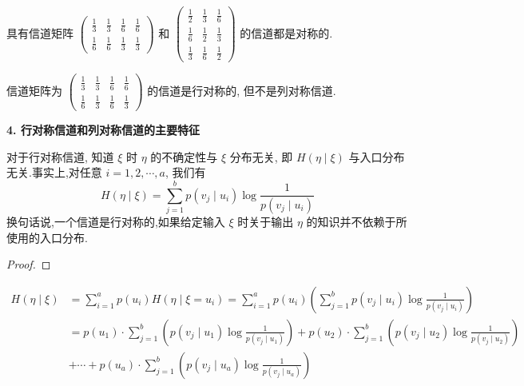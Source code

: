 \begin{example}
    具有信道矩阵 $ \left(\begin{array}{cccc}\frac{1}{3} & \frac{1}{3} & \frac{1}{6} & \frac{1}{6} \\ \frac{1}{6} & \frac{1}{6} & \frac{1}{3} & \frac{1}{3}\end{array}\right) $ 和 $ \left(\begin{array}{ccc}\frac{1}{2} & \frac{1}{3} & \frac{1}{6} \\ \frac{1}{6} & \frac{1}{2} & \frac{1}{3} \\ \frac{1}{3} & \frac{1}{6} & \frac{1}{2}\end{array}\right) $ 的信道都是对称的.

信道矩阵为 $ \left(\begin{array}{cccc}\frac{1}{3} & \frac{1}{3} & \frac{1}{6} & \frac{1}{6} \\ \frac{1}{6} & \frac{1}{3} & \frac{1}{6} & \frac{1}{3}\end{array}\right) $ 的信道是行对称的, 但不是列对称信道.
\end{example}

\textbf{4. 行对称信道和列对称信道的主要特征}

\begin{theorem}
     对于行对称信道, 知道 $ \xi $ 时 $ \eta $ 的不确定性与 $ \xi $ 分布无关, 即 $ H(\eta \mid \xi) $ 与入口分布无关.事实上,对任意 $ i=1,2, \cdots, a $, 我们有
$$
H(\eta \mid \xi)=\sum_{j=1}^{b} p\left(v_{j} \mid u_{i}\right) \log \frac{1}{p\left(v_{j} \mid u_{i}\right)}
$$
换句话说,一个信道是行对称的,如果给定输入 $ \xi $ 时关于输出 $ \eta $ 的知识并不依赖于所使用的入口分布.
\end{theorem}
\begin{proof}
    
\end{proof}
 $$ \begin{aligned}H(\eta \mid \xi)&=\sum_{i=1}^{a} p\left(u_{i}\right) H\left(\eta \mid \xi=u_{i}\right) 
=\sum_{i=1}^{a} p\left(u_{i}\right)\left(\sum_{j=1}^{b} p\left(v_{j} \mid u_{i}\right) \log \frac{1}{p\left(v_{j} \mid u_{i}\right)}\right)\\
&=p\left(u_{1}\right) \cdot \sum_{j=1}^{b}\left(p\left(v_{j} \mid u_{1}\right) \log \frac{1}{p\left(v_{j} \mid u_{1}\right)}\right)+p\left(u_{2}\right) \cdot \sum_{j=1}^{b}\left(p\left(v_{j} \mid u_{2}\right) \log \frac{1}{p\left(v_{j} \mid u_{2}\right)}\right) \\
&+\cdots+p\left(u_{a}\right) \cdot \sum_{j=1}^{b}\left(p\left(v_{j} \mid u_{a}\right) \log \frac{1}{p\left(v_{j} \mid u_{a}\right)}\right)
\end{aligned}
$$

